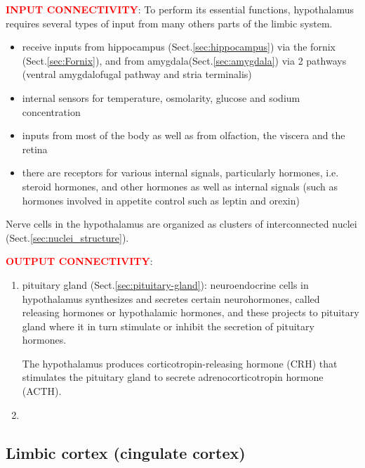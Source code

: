 \textcolor{red}{\bf INPUT CONNECTIVITY}: 
To perform its essential functions, hypothalamus requires several types of input
from many others parts of the limbic system.
\begin{itemize}
  \item receive inputs from hippocampus (Sect.\ref{sec:hippocampus}) via the
  fornix (Sect.\ref{sec:Fornix}), and from
  amygdala(Sect.\ref{sec:amygdala}) via 2 pathways (ventral amygdalofugal pathway and
  stria terminalis)
  
  \item  internal sensors for temperature, osmolarity, glucose and sodium
  concentration
  
  \item inputs from most of the body as well as from olfaction, the viscera and
  the retina
  
  \item there are receptors for various internal signals, particularly hormones, 
  i.e. steroid hormones, and other hormones as well as internal signals (such as
  hormones involved in appetite control such as leptin and orexin)
   
\end{itemize}
Nerve cells in the hypothalamus are organized as clusters of interconnected
nuclei (Sect.\ref{sec:nuclei_structure}).

\textcolor{red}{\bf OUTPUT CONNECTIVITY}:

\begin{enumerate}

  \item pituitary gland (Sect.\ref{sec:pituitary-gland}): neuroendocrine cells
  in hypothalamus synthesizes and secretes certain neurohormones, called
  releasing hormones or hypothalamic hormones, and these projects to pituitary
  gland where it in turn stimulate or inhibit the secretion of pituitary
  hormones.

The hypothalamus produces corticotropin-releasing hormone (CRH) that stimulates
the pituitary gland to secrete adrenocorticotropin hormone (ACTH).
  
  
  \item 
\end{enumerate}

\subsection{Limbic cortex (cingulate cortex)}
\label{sec:limbic_cortex}
\label{sec:cingulate_cortex}

